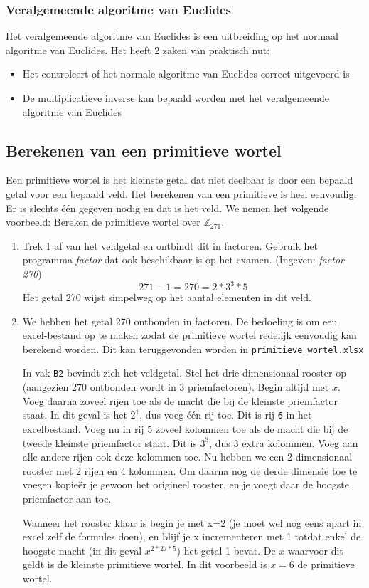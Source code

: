 \subsubsection{Veralgemeende algoritme van Euclides}
Het veralgemeende algoritme van Euclides is een uitbreiding op het normaal algoritme van Euclides. Het heeft 2 zaken van praktisch nut:

\begin{itemize}
 \item Het controleert of het normale algoritme van Euclides correct uitgevoerd is
 \item De multiplicatieve inverse kan bepaald worden met het veralgemeende algoritme van Euclides
\end{itemize}


\subsection{Berekenen van een primitieve wortel}
Een primitieve wortel is het kleinste getal dat niet deelbaar is door een bepaald getal voor een bepaald veld. Het berekenen van een primitieve is heel eenvoudig. 
Er is slechts één gegeven nodig en dat is het veld. We nemen het volgende voorbeeld: Bereken de primitieve wortel over $\mathbb{Z}_{271}.$

\begin{enumerate}
 \item Trek 1 af van het veldgetal en ontbindt dit in factoren. Gebruik het programma {\it factor} dat ook beschikbaar is op het examen. (Ingeven: {\sl factor 270}) 
  $$271- 1 = 270 = 2 * 3^3 * 5$$
  Het getal 270 wijst simpelweg op het aantal elementen in dit veld.
 \item We hebben het getal 270 ontbonden in factoren. De bedoeling is om een excel-bestand op te maken zodat de primitieve wortel redelijk eenvoudig kan berekend worden. Dit kan teruggevonden worden in \texttt{primitieve\_wortel.xlsx}

 In vak \texttt{B2} bevindt zich het veldgetal. Stel het drie-dimensionaal rooster op (aangezien 270 ontbonden wordt in 3 priemfactoren). Begin altijd met $x$. Voeg daarna zoveel rijen toe als de macht die bij de kleinste priemfactor staat. In dit geval is het $2^1$, dus voeg één rij toe. Dit is rij \texttt{6} in het excelbestand. Voeg nu in rij 5 zoveel kolommen toe als de macht die bij de tweede kleinste priemfactor staat. Dit is $3^3$, dus 3 extra kolommen. Voeg aan alle andere rijen ook deze kolommen toe. Nu hebben we een 2-dimensionaal rooster met 2 rijen en 4 kolommen. Om daarna nog de derde dimensie toe te voegen kopieër je gewoon het origineel rooster, en je voegt daar de hoogste priemfactor aan toe. 
 
 Wanneer het rooster klaar is begin je met x=2 (je moet wel nog eens apart in excel zelf de formules doen), en blijf je x incrementeren met 1 totdat enkel de hoogste macht (in dit geval $x^{2*27*5}$) het getal 1 bevat. De $x$ waarvoor dit geldt is de kleinste primitieve wortel. In dit voorbeeld is $x = 6$ de primitieve wortel.
 \end{enumerate}

